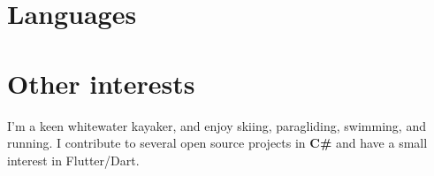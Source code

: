 \documentclass[11pt,a4paper,sans]{moderncv}        %
\begin{document}
\section{Languages}

\section{Other interests}
I'm a keen whitewater kayaker, and enjoy skiing, paragliding, swimming, and running. I contribute to several open source projects in \textbf{C\#} and have a small interest in Flutter/Dart.

\clearpage
\end{document}
